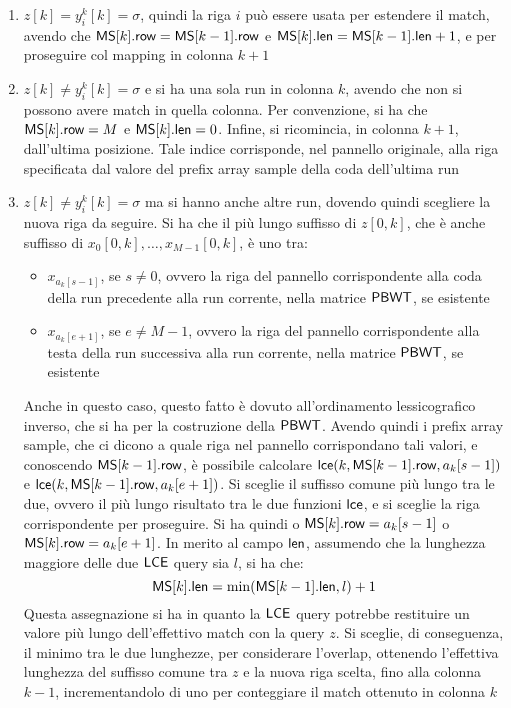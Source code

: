 \begin{enumerate}
  \item $z[k]=y_i^k[k]=\sigma$, quindi la riga $i$ può essere usata per
  estendere il 
  match, avendo che $\mbox{\rm {\sf MS}}[k].\mbox{\rm {\sf row}}=\mbox{\rm {\sf MS}}[k-1].\mbox{\rm {\sf row}}$ e $\mbox{\rm {\sf MS}}[k].\mbox{\rm {\sf len}}=\mbox{\rm {\sf MS}}[k-1].\mbox{\rm {\sf len}}+1$,
  e per 
  proseguire col mapping in colonna $k+1$
  \item $z[k]\neq y_i^k[k]=\sigma$ e si ha una sola run in colonna $k$, avendo
  che 
  non si possono avere match in quella colonna. Per convenzione, si
  ha che $\mbox{\rm {\sf MS}}[k].\mbox{\rm {\sf row}} = M$ e $\mbox{\rm {\sf MS}}[k].\mbox{\rm {\sf len}}=0$. Infine, si ricomincia, in
  colonna 
  $k+1$, dall'ultima posizione. Tale indice corrisponde, nel pannello originale,
  alla riga specificata dal valore del prefix array sample della coda
  dell'ultima run 
  \item $z[k]\neq y_i^k[k]=\sigma$ ma si hanno anche altre run, dovendo quindi
  scegliere 
  la nuova riga da seguire. Si ha che il più lungo suffisso di $z[0,k]$, che è
  anche suffisso di $x_0[0,k],\ldots, x_{M-1}[0,k]$, è uno tra:
  \begin{itemize}
    \item $x_{a_k[s-1]}$, se $s\neq 0$, ovvero la riga del pannello
    corrispondente alla coda della run precedente alla run corrente, nella
    matrice $\mbox{\rm {\sf PBWT}}$, se esistente
    \item $x_{a_k[e+1]}$, se $e\neq M-1$, ovvero la riga del pannello
    corrispondente alla testa della run successiva alla run corrente, nella
    matrice $\mbox{\rm {\sf PBWT}}$, se esistente
  \end{itemize}
  Anche in questo caso, questo fatto è dovuto all'ordinamento lessicografico
  inverso, che si ha per la costruzione della $\mbox{\rm {\sf PBWT}}$.
  Avendo quindi i prefix array sample, che ci dicono a quale riga nel
  pannello corrispondano tali valori, e conoscendo $\mbox{\rm {\sf MS}}[k-1].\mbox{\rm {\sf row}}$, è possibile
  calcolare $\mbox{\rm {\sf lce}}(k,\mbox{\rm {\sf MS}}[k-1].\mbox{\rm {\sf row}}, a_k[s-1])$ e $\mbox{\rm {\sf lce}}(k,\mbox{\rm {\sf MS}}[k-1].\mbox{\rm {\sf row}},
  a_k[e+1])$. Si sceglie il suffisso comune più lungo tra le due, ovvero il più
  lungo risultato tra le due funzioni $\mbox{\rm {\sf lce}}$, e si sceglie la riga
  corrispondente per proseguire. Si ha quindi o $\mbox{\rm {\sf MS}}[k].\mbox{\rm {\sf row}}=a_k[s-1]$ o
  $\mbox{\rm {\sf MS}}[k].\mbox{\rm {\sf row}}=a_k[e+1]$. In merito al campo $\mbox{\rm {\sf len}}$, assumendo che la lunghezza
  maggiore delle due $\mbox{\rm {\sf LCE}}$ query sia $l$, si ha che:
  \begin{equation}
    \label{eq:mslce1}
    \mbox{\rm {\sf MS}}[k].\mbox{\rm {\sf len}}=\min(\mbox{\rm {\sf MS}}[k-1].\mbox{\rm {\sf len}}, l)+1
  \end{equation}
  Questa assegnazione si ha in quanto la $\mbox{\rm {\sf LCE}}$ query potrebbe restituire un
  valore più lungo dell'effettivo 
  match con la query $z$. Si sceglie, di conseguenza, il minimo tra le due
  lunghezze, per considerare l'overlap, 
  ottenendo l'effettiva lunghezza del suffisso comune tra $z$ e la nuova riga
  scelta, fino alla colonna $k-1$, incrementandolo di uno per conteggiare il
  match ottenuto in colonna $k$ 
\end{enumerate}
